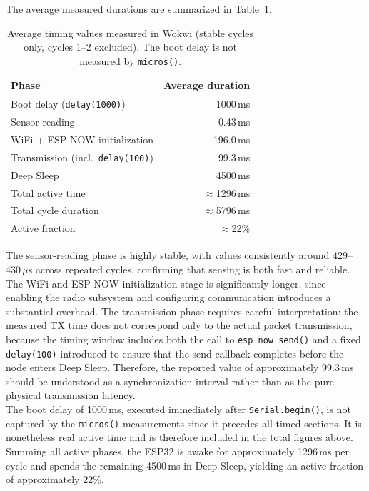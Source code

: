 \documentclass[a4paper,11pt]{article}
\begin{document}
The average measured durations are summarized in Table~\ref{tab:timings}.

\begin{table}[H]
\centering
\begin{tabular}{>{\raggedright\arraybackslash}p{7cm}r}
\toprule
\textbf{Phase} & \textbf{Average duration} \\
\midrule
Boot delay (\texttt{delay(1000)})   & 1000\,ms \\
Sensor reading                       &  0.43\,ms \\
WiFi + ESP-NOW initialization        & 196.0\,ms \\
Transmission (incl.\ \texttt{delay(100)}) & 99.3\,ms \\
Deep Sleep                           & 4500\,ms \\
\midrule
Total active time                    & $\approx$1296\,ms \\
Total cycle duration                 & $\approx$5796\,ms \\
Active fraction                      & $\approx$22\% \\
\bottomrule
\end{tabular}
\caption{Average timing values measured in Wokwi (stable cycles only, cycles 1--2
excluded). The boot delay is not measured by \texttt{micros()}.}
\label{tab:timings}
\end{table}

The sensor-reading phase is highly stable, with values consistently around
429--430\,$\mu$s across repeated cycles, confirming that sensing is both fast and
reliable. The WiFi and ESP-NOW initialization stage is significantly longer, since
enabling the radio subsystem and configuring communication introduces a substantial
overhead. The transmission phase requires careful interpretation: the measured TX time
does not correspond only to the actual packet transmission, because the timing window
includes both the call to \texttt{esp\_now\_send()} and a fixed \texttt{delay(100)}
introduced to ensure that the send callback completes before the node enters Deep
Sleep. Therefore, the reported value of approximately 99.3\,ms should be understood
as a synchronization interval rather than as the pure physical transmission latency.\\

The boot delay of 1000\,ms, executed immediately after \texttt{Serial.begin()}, is
not captured by the \texttt{micros()} measurements since it precedes all timed
sections. It is nonetheless real active time and is therefore included in the total
figures above. Summing all active phases, the ESP32 is awake for approximately
1296\,ms per cycle and spends the remaining 4500\,ms in Deep Sleep, yielding an
active fraction of approximately 22\%.
\end{document}
